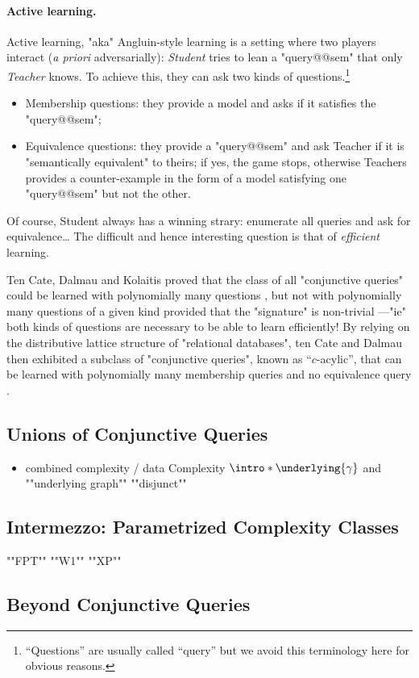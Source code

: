 \paragraph*{Active learning.}
Active learning, "aka" Angluin-style learning is a setting where
two players interact (\emph{a priori} adversarially): \emph{Student} tries
to lean a "query@@sem" that only \emph{Teacher} knows. To achieve this,
they can ask two kinds of questions.\footnote{``Questions'' are usually called 
``query'' but we avoid this terminology here for obvious reasons.}
\begin{itemize}
	\item Membership questions: they provide a model and asks if it satisfies the "query@@sem";
	\item Equivalence questions: they provide a "query@@sem" and ask Teacher if
		it is "semantically equivalent" to theirs; if yes, the game stops, otherwise
		Teachers provides a counter-example in the form of a model satisfying
		one "query@@sem" but not the other.
\end{itemize}
Of course, Student always has a winning strary: enumerate all queries
and ask for equivalence… The difficult and hence interesting question
is that of \emph{efficient} learning.

Ten Cate, Dalmau and Kolaitis proved that 
the class of all "conjunctive queries" could be
learned with polynomially many questions \cite[Theorem~A]{tenCateDalmauKolaitis2013Learning},
but not with polynomially many questions of a given kind provided
that the "signature" is non-trivial \cite[Theorem~B]{tenCateDalmauKolaitis2013Learning}---"ie"
both kinds of questions are necessary to be able to learn efficiently!
By relying on the distributive lattice structure of "relational databases",
ten Cate and Dalmau then exhibited a subclass of "conjunctive queries",
known as ``$c$-acylic'', that can be learned with
polynomially many membership queries
and no equivalence query \cite[Theorem~5.2]{tenCateDalmau2021ActiveLearning}.


\subsection{Unions of Conjunctive Queries}

\begin{itemize}
	\item combined complexity / data Complexity
	\itemAP $\intro*\underlying{\gamma}$ and ""underlying graph""
	\itemAP ""disjunct""
\end{itemize}

\subsection{Intermezzo: Parametrized Complexity Classes}

\begin{itemize}
	\itemAP ""FPT""
	\itemAP ""W1""
	\itemAP ""XP""
\end{itemize}

\subsection{Beyond Conjunctive Queries}